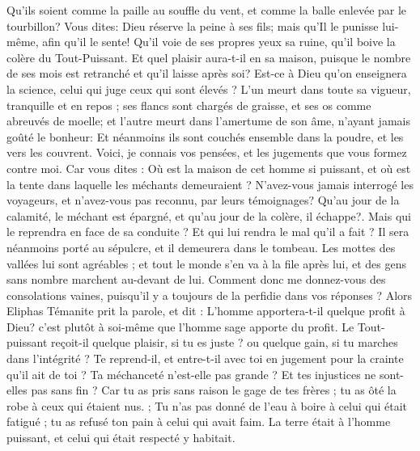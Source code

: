 \begin{multicols}{2}
{Qu'ils soient comme la paille au souffle du vent, et comme la balle enlevée par le tourbillon?
Vous dites: Dieu réserve la peine à ses fils;  mais qu'Il le punisse lui-même, afin qu'il le sente! 
Qu'il voie de ses propres yeux sa ruine, qu'il boive la colère du Tout-Puissant.
Et quel plaisir aura-t-il en sa maison, puisque le nombre de ses mois est retranché et qu'il laisse après soi? 
Est-ce à Dieu qu'on enseignera la science, celui qui juge ceux qui sont élevés ?
L'un meurt dans toute sa vigueur, tranquille et en repos ; 
ses flancs sont chargés de graisse, et ses os comme abreuvés de moelle; 
et l'autre meurt dans l'amertume de son âme, n'ayant jamais goûté le bonheur: 
Et néanmoins ils sont couchés ensemble dans la poudre, et les vers les couvrent. 
Voici, je connais vos pensées, et les jugements que vous formez contre moi. 
Car vous dites : Où est la maison de cet homme si puissant, et où est la tente dans laquelle les méchants demeuraient ? 
N'avez-vous jamais interrogé les voyageurs, et n'avez-vous pas reconnu, par leurs témoignages?
Qu'au jour de la calamité, le méchant est épargné, et qu'au jour de la colère, il échappe?.
Mais qui le reprendra en face de sa conduite ? Et qui lui rendra le mal qu'il a fait ?
Il sera néanmoins porté au sépulcre, et il demeurera dans le tombeau.
Les mottes des vallées lui sont agréables ; et tout le monde s'en va à la file après lui, et des gens sans nombre marchent au-devant de lui. 
Comment donc me donnez-vous des consolations vaines, puisqu'il y a toujours de la perfidie dans vos réponses ? 
\VerseOne{}Alors Eliphas Témanite prit la parole, et dit : 
L'homme apportera-t-il quelque profit à Dieu? c'est plutôt à soi-même que l'homme sage apporte du profit. 
Le Tout-puissant reçoit-il quelque plaisir, si tu es juste ? ou quelque gain, si tu marches dans l'intégrité ?
Te reprend-il, et entre-t-il avec toi en jugement pour la crainte qu'il ait de toi ? 
Ta méchanceté n'est-elle pas grande ? Et tes injustices ne sont-elles pas sans fin ? 
Car tu as pris sans raison le gage de tes frères ; tu as ôté la robe à ceux qui étaient nus. ;
Tu n'as pas donné de l'eau à boire à celui qui était fatigué ; tu as refusé ton pain à celui qui avait faim.
La terre était à l'homme puissant, et celui qui était respecté y habitait. 
}
\end{multicols}
